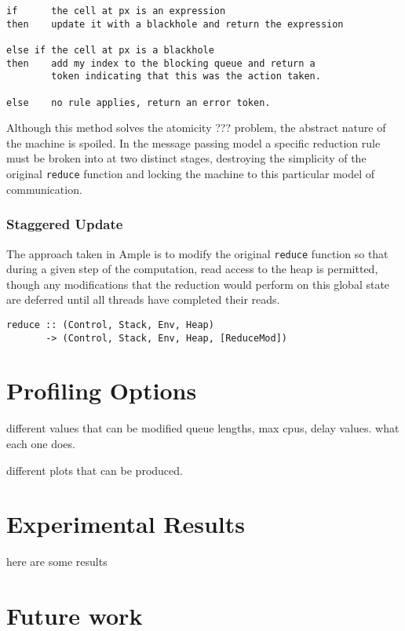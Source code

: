 \documentclass{llncs}
\begin{document}
\begin{verbatim}
if      the cell at px is an expression 
then    update it with a blackhole and return the expression

else if the cell at px is a blackhole 
then    add my index to the blocking queue and return a
        token indicating that this was the action taken.

else    no rule applies, return an error token.
\end{verbatim}

Although this method solves the atomicity ??? problem, the abstract nature of the machine is spoiled. In the message passing model a specific reduction rule must be broken into at two distinct stages, destroying the simplicity of the original \texttt{reduce} function and locking the machine to this particular model of communication.


\subsubsection{Staggered Update}
The approach taken in Ample is to modify the original \texttt{reduce} function so that during a given step of the computation, read access to the heap is permitted, though any modifications that the reduction would perform on this global state are deferred until all threads have completed their reads. 

\begin{verbatim}
reduce :: (Control, Stack, Env, Heap) 
       -> (Control, Stack, Env, Heap, [ReduceMod])
\end{verbatim}



\section{Profiling Options}

different values that can be modified
queue lengths, max cpus, delay values.
what each one does.

different plots that can be produced.



\section{Experimental Results}
here are some results


\section{Future work}
\end{document}
